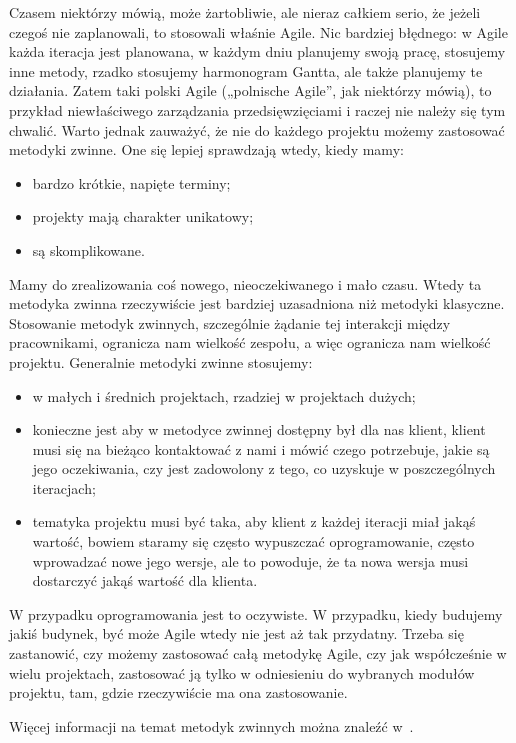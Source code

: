 Czasem niektórzy mówią, może żartobliwie, ale nieraz całkiem serio, że jeżeli czegoś nie zaplanowali,
to stosowali właśnie Agile. Nic bardziej błędnego: w Agile każda iteracja jest planowana,
w każdym dniu planujemy swoją pracę, stosujemy inne metody, rzadko stosujemy harmonogram Gantta,
ale także planujemy te działania. Zatem taki polski Agile („polnische Agile”, jak niektórzy mówią),
to przykład niewłaściwego zarządzania przedsięwzięciami i raczej nie należy się tym chwalić.
Warto jednak zauważyć, że nie do każdego projektu możemy zastosować metodyki zwinne.
One się lepiej sprawdzają wtedy, kiedy mamy:
\begin{itemize}
	\item bardzo krótkie, napięte terminy;
	\item projekty mają charakter unikatowy;
	\item są skomplikowane.
\end{itemize}

Mamy do zrealizowania coś nowego, nieoczekiwanego i mało czasu.
Wtedy ta metodyka zwinna rzeczywiście jest bardziej uzasadniona niż metodyki klasyczne.
Stosowanie metodyk zwinnych, szczególnie żądanie tej interakcji między pracownikami,
ogranicza nam wielkość zespołu, a więc ogranicza nam wielkość projektu.
Generalnie metodyki zwinne stosujemy:
\begin{itemize}
	\item w małych i średnich projektach, rzadziej w projektach dużych;
	\item konieczne jest aby w metodyce zwinnej dostępny był dla nas klient,
	klient musi się na bieżąco kontaktować z nami i mówić czego potrzebuje,
	jakie są jego oczekiwania, czy jest zadowolony z tego, co uzyskuje w poszczególnych iteracjach;
	\item tematyka projektu musi być taka, aby klient z każdej iteracji miał jakąś wartość,
	bowiem staramy się często wypuszczać oprogramowanie, często wprowadzać nowe jego wersje,
	ale to powoduje, że ta nowa wersja musi dostarczyć jakąś wartość dla klienta.
\end{itemize}

W przypadku oprogramowania jest to oczywiste. W przypadku, kiedy budujemy jakiś budynek,
być może Agile wtedy nie jest aż tak przydatny.
Trzeba się zastanowić, czy możemy zastosować całą metodykę Agile,
czy jak współcześnie w wielu projektach, zastosować ją tylko w odniesieniu
do wybranych modułów projektu, tam, gdzie rzeczywiście ma ona zastosowanie.

Więcej informacji na temat metodyk zwinnych można znaleźć w~\cite{Cohen_2006}.
